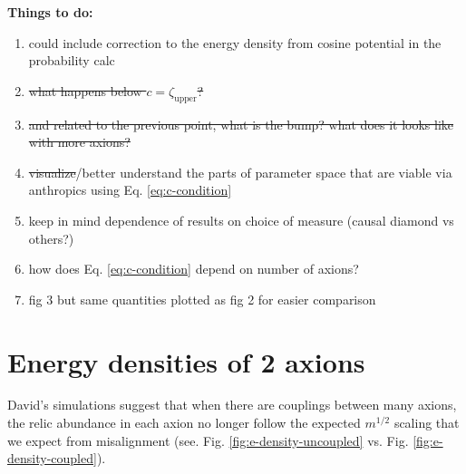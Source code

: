 \documentclass[11pt]{article}
\begin{document}
\break
\color{red}\noindent \textbf{Things to do:}
\begin{enumerate}
    \item could include correction to the energy density from cosine potential in the probability calc
    \item \st{what happens below $c=\zeta_\text{upper}$?}
    \item \st{and related to the previous point, what is the bump? what does it looks like with more axions?}
    \item \st{visualize}/better understand the parts of parameter space that are viable via anthropics using Eq. \eqref{eq:c-condition}
    \item keep in mind dependence of results on choice of measure (causal diamond vs others?)
    \item how does Eq. \eqref{eq:c-condition} depend on number of axions?
    \item fig 3 but same quantities plotted as fig 2 for easier comparison
\end{enumerate}\color{black}

\section{Energy densities of 2 axions}

David's simulations suggest that when there are couplings between many axions, the relic abundance in each axion no longer follow the expected $m^{1/2}$ scaling that we expect from misalignment (see. Fig. \ref{fig:e-density-uncoupled} vs. Fig. \ref{fig:e-density-coupled}).
\end{document}
